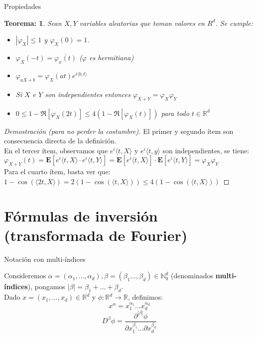 \documentclass{beamer}
\newcommand{\R}{\mathbb{R}}
\newcommand{\Rd}{\R^{d}}
\newcommand{\vp}{\varphi}
\newcommand{\E}{\mathbf{E}}
\newcommand{\N}{\mathbb{N}}
\newtheorem{teo}{Teorema:}
\begin{document}
\begin{frame}{Propiedades}
		\begin{teo}
		Sean $X,Y$ variables aleatorias que toman valores en $R^{d}$. Se cumple: 
		\begin{itemize}
			\item $ |\vp_{X}| \leq 1 $ y $ \vp_{X}(0) =1 $.
			\item $\vp_{X}(-t)= \overline{\vp_{x}(t)}$ ($\vp$ es hermitiana)
			\item $\vp _{aX+b}= \vp_{X} (at) e^{i \langle b,t \rangle} $
			\item Si $X$ e $Y$ son independientes entonces $\vp_{X+Y}=\vp_{X}\vp_{Y}$
			\item $0 \leq 1- \Re[\vp_{X}(2t)] \leq 4 (1- \Re[\vp_{X}(t)] ) $ para todo $t \in \R^{d}$
		\end{itemize}
	\end{teo}
\begin{proof} [Demostración (para no perder la costumbre)]
	El primer y segundo ítem son consecuencia directa de la definición.\\
	
	En el tercer ítem, observamos que $e^i {\langle t,X \rangle}$ y $e^i {\langle t,y \rangle}$ son independientes, se tiene: 
	$ \vp_{X+Y} (t)= \E [ e^i {\langle t,X \rangle} \cdot e^i {\langle t,Y \rangle}]= \E [ e^i {\langle t,X \rangle}] \cdot \E [e^i {\langle t,Y \rangle}] = \vp_{X } \vp _{Y} $\\
	
	Para el cuarto ítem, basta ver que: $ 1-\cos (\langle 2t,X \rangle ) = 2( 1- \cos ( \langle t,X \rangle ) ) \leq 4 (1-\cos (\langle t,X \rangle)) $
\end{proof}
\end{frame}


	
	
\section{Fórmulas de inversión (transformada de Fourier)}

\begin{frame}{Notación con multi-índices}
	
	Consideremos $\alpha= (\alpha_{1}, \ldots , \alpha_{d}), \beta= (\beta_{1} \ldots, \beta_{d}) \in \N_{0}^{d}$ (denominados \textbf{multi-índices}), pongamos $|\beta|=\beta_{1}+ \ldots + \beta_{d}$.\\
	 Dado $x=(x_{1}, \ldots, x_{d}) \in\Rd$ y $\phi: \Rd \rightarrow \R $, definimos:
	 $$ x^{\alpha}= x_{1}^{\alpha_{1}}\ldots x_{d}^{\alpha_{d}} $$
	 $$ D^{\beta} \phi = \frac{\partial ^{| \beta|} \phi } {\partial x_{1}^{\beta_{1}}\ldots \partial x_{d}^{\beta_{d}}  } $$
\end{frame}
\end{document}
